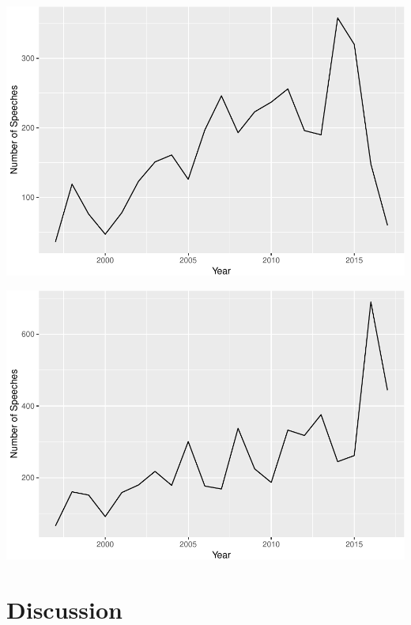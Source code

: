 \documentclass[]{article}
\let\origfigure\figure
\let\endorigfigure\endfigure
\renewenvironment{figure}[1][2] {
    \expandafter\origfigure\expandafter[H]
} {
    \endorigfigure
}
\begin{document}
\begin{figure}
\centering
\includegraphics{methodology_files/figure-latex/wales-scotland-plot-1.pdf}
\caption{\label{wales-scotland-validity}Number of Speeches in ``Wales \&
Scotland'' Topic per Year}
\end{figure}

\begin{figure}
\centering
\includegraphics{methodology_files/figure-latex/eu-plot-1.pdf}
\caption{\label{eu-validity}Number of Speeches in ``European Union''
Topic per Year}
\end{figure}

\hypertarget{discussion}{%
\section{Discussion}\label{discussion}}
\end{document}
